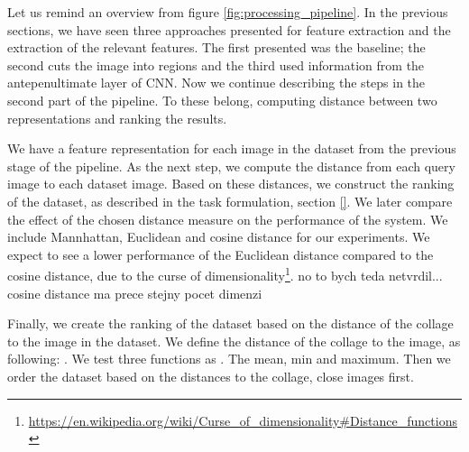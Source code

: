 Let us remind an overview from figure \ref{fig:processing_pipeline}. In the previous sections, we have seen three approaches presented for feature extraction and the extraction of the relevant features. The first presented was the baseline; the second cuts the image into regions and the third used information from the antepenultimate layer of CNN. Now we continue describing the steps in the second part of the pipeline. To these belong, computing distance between two representations and ranking the results.


We have a feature representation for each image in the dataset from the previous stage of the pipeline. As the next step, we compute the distance from each query image to each dataset image. Based on these distances, we construct the ranking of the dataset, as described in the task formulation, section \ref{}\todo{}. We later compare the effect of the chosen distance measure on the performance of the system. We include Mannhattan, Euclidean and cosine distance for our experiments. We expect to see a lower performance of the Euclidean distance compared to the cosine distance, due to the curse of dimensionality\footnote{\url{https://en.wikipedia.org/wiki/Curse\_of\_dimensionality\#Distance\_functions}}. {\color{red} no to bych teda netvrdil... cosine distance ma prece stejny pocet dimenzi}

Finally, we create the ranking of the dataset based on the distance of the collage to the image in the dataset. We define the distance of the collage to the image, as following: \todo{}. We test three functions as $ $\todo{}. The mean, min and maximum. Then we order the dataset based on the distances to the collage, close images first.



